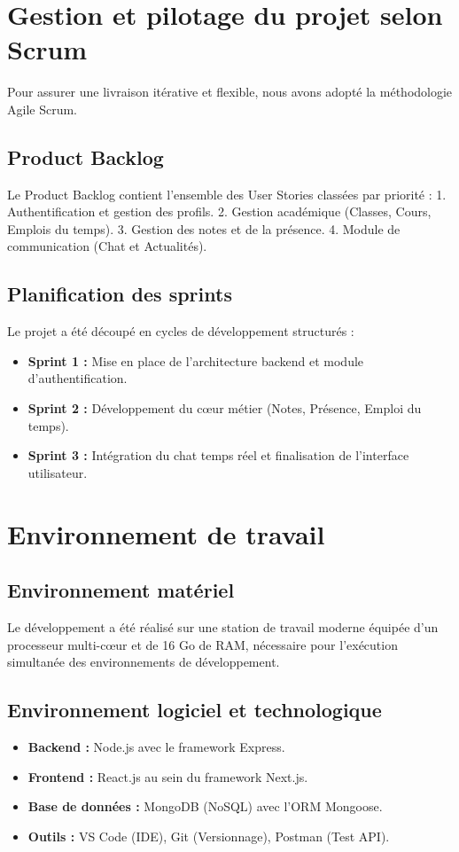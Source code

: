 \section{Gestion et pilotage du projet selon Scrum}
Pour assurer une livraison itérative et flexible, nous avons adopté la méthodologie Agile Scrum.

\subsection{Product Backlog}
Le Product Backlog contient l'ensemble des User Stories classées par priorité :
1. Authentification et gestion des profils.
2. Gestion académique (Classes, Cours, Emplois du temps).
3. Gestion des notes et de la présence.
4. Module de communication (Chat et Actualités).

\subsection{Planification des sprints}
Le projet a été découpé en cycles de développement structurés :
\begin{itemize}
    \item \textbf{Sprint 1 :} Mise en place de l'architecture backend et module d'authentification.
    \item \textbf{Sprint 2 :} Développement du cœur métier (Notes, Présence, Emploi du temps).
    \item \textbf{Sprint 3 :} Intégration du chat temps réel et finalisation de l'interface utilisateur.
\end{itemize}

\section{Environnement de travail}

\subsection{Environnement matériel}
Le développement a été réalisé sur une station de travail moderne équipée d'un processeur multi-cœur et de 16 Go de RAM, nécessaire pour l'exécution simultanée des environnements de développement.

\subsection{Environnement logiciel et technologique}
\begin{itemize}
    \item \textbf{Backend :} Node.js avec le framework Express.
    \item \textbf{Frontend :} React.js au sein du framework Next.js.
    \item \textbf{Base de données :} MongoDB (NoSQL) avec l'ORM Mongoose.
    \item \textbf{Outils :} VS Code (IDE), Git (Versionnage), Postman (Test API).
\end{itemize}

